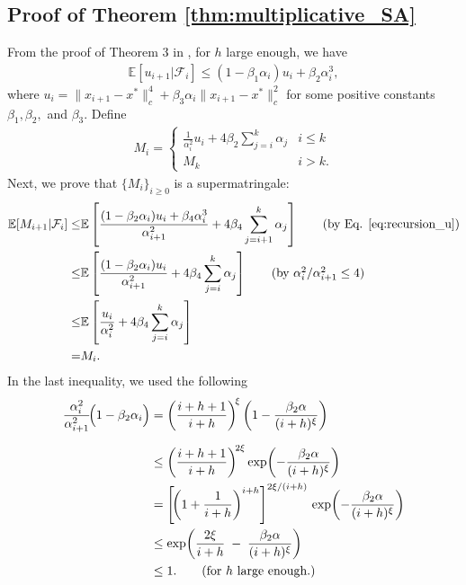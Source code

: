 \documentclass[letterpaper, 10 pt]{article}
\newcommand{\E}{\mathbb{E}}
\begin{document}
\subsection{Proof of Theorem \ref{thm:multiplicative_SA}} \label{proof:multiplicative_SA}

From the proof of Theorem 3 in \cite{moulines2011non}, for $h$ large enough, we have
\begin{align}\label{eq:recursion_u}
    \E[u_{i+1} |\mathcal{F}_i] \leq (1-\beta_1\alpha_i)u_i + \beta_2\alpha_i^3,
\end{align}
where $u_i=\|x_{i+1}-x^*\|_c^4 + \beta_3\alpha_i\|x_{i+1}-x^*\|_c^2$ for some positive constants $\beta_1,\beta_2,$ and $\beta_3$. Define 
\begin{align*}
    M_i= \begin{cases}
        \frac{1}{\alpha_i^2} u_i+4\beta_2 \sum_{j=i}^{k}\alpha_j &i\leq k\\
        M_k &i>k.
    \end{cases}
\end{align*}
Next, we prove that $\{M_i\}_{i\geq0}$ is a supermatringale:
\begin{align*}
    \E[M_{i+1} |\mathcal{F}_i] \leq& \E\left[\frac{(1-\beta_2\alpha_i)u_i + \beta_4\alpha_i^3}{\alpha_{i+1}^2} +4\beta_4 \sum_{j=i+1}^{k}\alpha_j\right]\tag{by Eq. \eqref{eq:recursion_u}}\\
    \leq& \E\left[ \frac{(1-\beta_2\alpha_i)u_i }{\alpha_{i+1}^2}+4\beta_4 \sum_{j=i}^{k} \alpha_j\right]\tag{by $\alpha_i^2/\alpha_{i+1}^2\leq 4$}\\
    \leq& \E\left[ \frac{u_i}{\alpha_i^2}+4\beta_4 \sum_{j=i}^{k} \alpha_j\right]\\
    =& M_i.
\end{align*}
In the last inequality, we used the following
\begin{align*}
\frac{\alpha_i^2}{\alpha_{i+1}^2}\!\Bigl(1-\beta_2\alpha_i\Bigr)
      &= \left(\frac{i+h+1}{i+h}\right)^{\!\xi}
        \left(1-\frac{\beta_2\alpha}{(i+h)^{\xi}}\right) \\[6pt]
&\le \left(\frac{i+h+1}{i+h}\right)^{\!2\xi}
      \exp\!\left(-\frac{\beta_2\alpha}{(i+h)^{\xi}}\right)\\
&=\left[\!\left(1+\frac{1}{i+h}\right)^{i+h}\right]^{2\xi/(i+h)}\,
     \exp\!\left(-\frac{\beta_2\alpha}{(i+h)^{\xi}}\right)\\
&\le \exp\!\left(\frac{2\xi}{i+h}\;-\;
                \frac{\beta_2\alpha}{(i+h)^{\xi}}\right)\\
&\le 1.\tag{for $h$ large enough.}
\end{align*}
\end{document}
